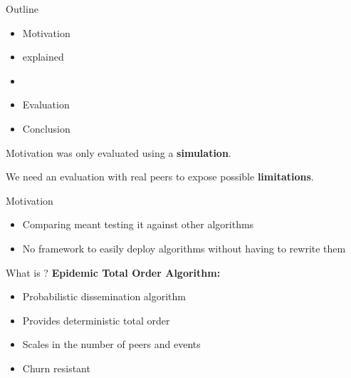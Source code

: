 



\begin{frame}[plain]
  
\titlepage

\end{frame}


\subtitle[Outline]{Outline}

\begin{frame}{Outline}
    \begin{itemize}
        \item Motivation
        \item \epto{} explained
        \item \sys
        \item Evaluation
        \item Conclusion
    \end{itemize}
\end{frame}

\subtitle[Introduction]{Introduction}

\begin{frame}{Motivation}
    \epto{} was only evaluated using a \textbf{simulation}. 
    
    We need an evaluation with real peers to expose possible \textbf{limitations}.
\end{frame}

\begin{frame}{Motivation}
  \begin{itemize}
  \item Comparing \epto{} meant testing it against other algorithms
  \item No framework to easily deploy algorithms without having to rewrite them
  \end{itemize}

\end{frame}

\subtitle[Description]{Description}

\begin{frame}{What is \epto{}?}
	\textbf{Epidemic Total Order Algorithm:}
	\begin{itemize}
		\item Probabilistic dissemination algorithm
		\item Provides deterministic total order
		\item Scales in the number of peers and events
		\item Churn resistant
	\end{itemize}
\end{frame}

